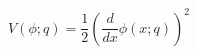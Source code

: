 \begin{equation}
\label{qp}
 V(\phi;q)=\frac 12\left(\frac{d}{dx}\phi(x;q)\right)^2
\end{equation}

